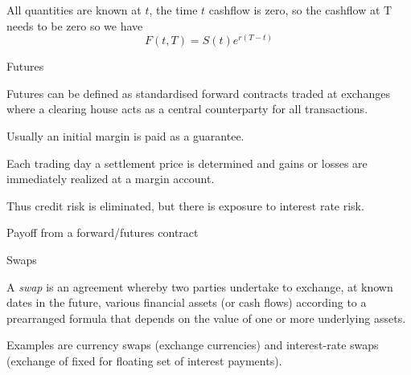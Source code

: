 All quantities are known at $t$, the time $t$ cashflow is zero, so the cashflow at T needs to be zero so we have $$F(t,T) = S(t)e^{r(T-t)}$$

{Futures}






	Futures can be defined as standardised forward contracts traded at exchanges where a clearing house acts as a central counterparty for all transactions.


	Usually an initial margin is paid as a guarantee.


	Each trading day a settlement price is determined and gains or losses are immediately realized at a margin account.


	Thus credit risk is eliminated, but there is exposure to interest rate risk.






{Payoff from a forward/futures contract}
\begin{figure}
  \centering
   \qquad
\end{figure}

{Swaps}






	
A {\it swap} is an agreement whereby two parties
undertake to exchange, at known dates in the future, various
financial assets (or cash flows) according to a prearranged
formula that depends on the value of one or more underlying
assets.


	
Examples are currency swaps (exchange currencies) and
interest-rate swaps (exchange of fixed for floating set of
interest payments).





